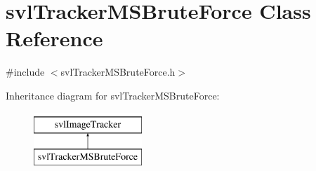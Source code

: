 \hypertarget{classsvl_tracker_m_s_brute_force}{\section{svl\-Tracker\-M\-S\-Brute\-Force Class Reference}
\label{classsvl_tracker_m_s_brute_force}
}


{\ttfamily \#include $<$svl\-Tracker\-M\-S\-Brute\-Force.\-h$>$}

Inheritance diagram for svl\-Tracker\-M\-S\-Brute\-Force\-:\begin{figure}[H]
\begin{center}
\leavevmode
\includegraphics[height=2.000000cm]{dd/dd3/classsvl_tracker_m_s_brute_force}
\end{center}
\end{figure}
